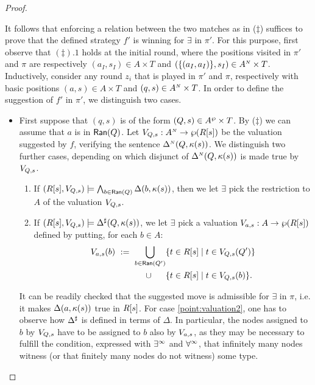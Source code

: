 \begin{proof}
\begin{enumerate}[(i)]
It follows that enforcing a relation between the two matches as in ($\ddag$) suffices to prove that the defined strategy $f'$ is winning for $\exists$ in $\pi'$. For this purpose, first observe that $(\ddag).1$ holds at the initial round, where the positions visited in $\pi'$ and $\pi$ are respectively $(a_I,s_I) \in A \times T$ and $(\{(a_I,a_I)\},s_I) \in A^{{\scriptscriptstyle N}} \times T$. Inductively, consider any round $z_i$ that is played in $\pi'$ and $\pi$, respectively with basic positions $(a,s) \in A \times T$ and $(q,s) \in A^{{\scriptscriptstyle N}} \times T$. In order to define the suggestion of $f'$ in $\pi'$, we distinguish two cases.
\begin{itemize}
  \item First suppose that $(q,s)$ is of the form $(Q,s) \in
  A^{\wp}\times T$. By ($\ddag$) we can assume that $a$ is in $\mathsf{Ran}(Q)$. Let $V_{Q,s} :A^{{\scriptscriptstyle N}} \rightarrow \wp(R[s])$ be the valuation suggested by $f$, verifying the sentence $\Delta^{{\scriptscriptstyle N}}(Q,\kappa(s))$. We distinguish two further cases, depending on which disjunct of $\Delta^{{\scriptscriptstyle N}}(Q,\kappa(s))$ is made true by $V_{Q,s}$.
      \begin{enumerate}[label=(\roman*), ref=\roman*]
        \item If $(R[s],V_{Q,s})\models \bigwedge_{b \in \mathsf{Ran}(Q)} \Delta(b,\kappa(s))$, then we let $\exists$ pick the restriction to $A$ of the valuation $V_{Q,s}$. \label{point:valuation1}
        \item If $(R[s],V_{Q,s})\models \Delta^{\sharp}(Q,\kappa(s))$, we let $\exists$ pick a valuation $V_{a,s}:A \rightarrow \wp (R[s])$ defined by putting, for each $b \in A$:
            \begin{align*}
               V_{a,s}(b)\ :=\ \bigcup_{b \in \mathsf{Ran}(Q')} &\{t \in R[s] \mid t \in V_{Q,s}(Q')\} \\
               \cup\ \ \ \ \ & \{t \in R[s] \mid t \in V_{Q,s}(b)\} .
            \end{align*} \label{point:valuation2}
      \end{enumerate}
      It can be readily checked that the suggested move is admissible for $\exists$ in $\pi$, i.e. it makes $\Delta(a,\kappa(s))$ true in $R[s]$. For case \eqref{point:valuation2}, one has to observe how $\Delta^{\sharp}$ is defined in terms of $\Delta$. In particular, the nodes assigned to $b$ by $V_{Q,s}$ have to be assigned to $b$ also by $V_{a,s}$, as they may be necessary to fulfill the condition, expressed with $\exists^\infty$ and $\forall^\infty$, that infinitely many nodes witness (or that finitely many nodes do not witness) some type.


\end{itemize}
\end{enumerate}
\end{proof}
